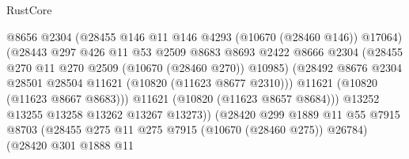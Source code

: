 \begin{lexlean}{RustCore}
\begin{coremodule}
                                          @8656
                                          @2304
                                          (@28455 @146 @11 @146 @4293 (@10670 (@28460 @146)) @17064)
                                          (@28443
                                            @297
                                            @426
                                            @11
                                            @53
                                            @2509
                                            @8683
                                            @8693
                                            @2422
                                            @8666
                                            @2304
                                            (@28455
                                              @270
                                              @11
                                              @270
                                              @2509
                                              (@10670 (@28460 @270))
                                              @10985)
                                            (@28492
                                              @8676
                                              @2304
                                              @28501
                                              @28504
                                              @11621
                                              (@10820 (@11623 @8677 @2310)))
                                            @11621
                                            (@10820 (@11623 @8667 @8683)))
                                          @11621
                                          (@10820 (@11623 @8657 @8684)))
                                        @13252
                                        @13255
                                        @13258
                                        @13262
                                        @13267
                                        @13273))
                                    (@28420
                                      @299
                                      @1889
                                      @11
                                      @55
                                      @7915
                                      @8703
                                      (@28455 @275 @11 @275 @7915 (@10670 (@28460 @275)) @26784)
                                      (@28420
                                        @301
                                        @1888
                                        @11

\end{coremodule}
\end{lexlean}
